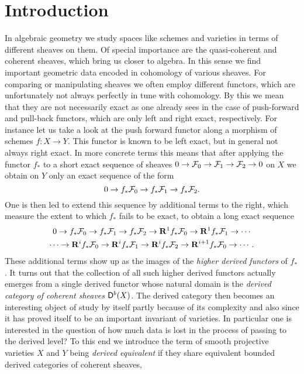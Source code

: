 \section*{Introduction}
{} %

In algebraic geometry we study spaces like schemes and varieties in terms of different sheaves on them. Of special importance are the quasi-coherent and coherent sheaves, which bring us closer to algebra. In this sense we find important geometric data encoded in cohomology of various sheaves. For comparing or manipulating sheaves we often employ different functors, which are unfortunately not always perfectly in tune with cohomology. By this we mean that they are not necessarily exact as one already sees in the case of push-forward and pull-back functors, which are only left and right exact, respectively.
For instance let us take a look at the push forward functor along a morphism of schemes $f \colon X \to Y$. This functor is known to be left exact, but in general not always right exact. In more concrete terms this means that after applying the functor $f_*$ to a short exact sequence of sheaves $0 \to \mathcal F_0 \to \mathcal F_1 \to \mathcal F_2 \to 0$ on $X$ we obtain on $Y$ only an exact sequence of the form
\[
    0 \to f_*\mathcal F_0 \to f_*\mathcal F_1 \to f_*\mathcal F_2.
\]
One is then led to extend this sequence by additional terms to the right, which measure the extent to which $f_*$ fails to be exact, to obtain a long exact sequence
\begin{multline*}
    0 \to f_*\mathcal F_0 \to f_*\mathcal F_1 \to f_*\mathcal F_2 \to \mathbf{R}^{1}f_*\mathcal F_0 \to \mathbf{R}^{1}f_*\mathcal F_1 \to \cdots \\
    \cdots \to \mathbf{R}^{i}f_*\mathcal F_0 \to \mathbf{R}^{i}f_*\mathcal F_1 \to \mathbf{R}^{i}f_*\mathcal F_2 \to \mathbf{R}^{i+1}f_*\mathcal F_0 \to \cdots.
\end{multline*}
These additional terms show up as the images of the \emph{higher derived functors} of $f_*$. It turns out that the collection of all such higher derived functors actually emerges from a single derived functor whose natural domain is the \emph{derived category of coherent sheaves} $\mathsf{D}^b(X)$. The derived category then becomes an interesting object of study by itself partly because of its complexity and also since it has proved itself to be an important invariant of varieties. In particular one is interested in the question of how much data is lost in the process of passing to the derived level? To this end we introduce the term of smooth projective varieties $X$ and $Y$ being \emph{derived equivalent} if they share equivalent bounded derived categories of coherent sheaves, \ie 

